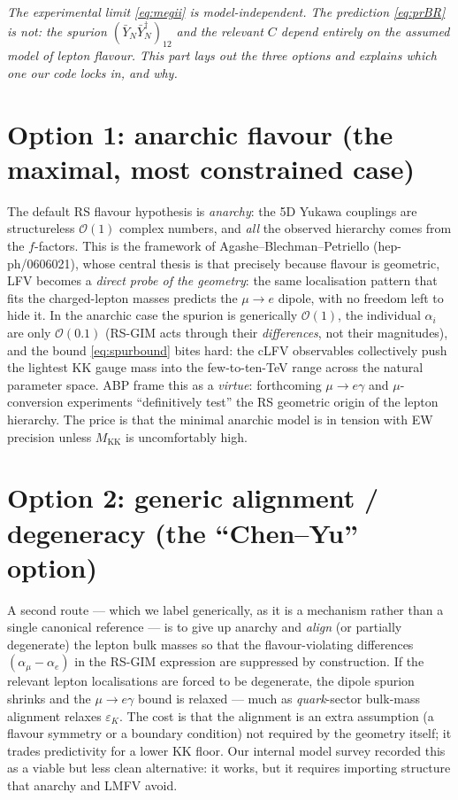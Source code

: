 \documentclass[11pt]{article}
\newcommand{\MKK}{M_{\mathrm{KK}}}
\newcommand{\eps}{\varepsilon}
\newcommand{\YNb}{\bar Y_N}
\newcommand{\spur}{(\YNb\YNb^\dagger)_{12}}
\theoremstyle{definition}
\begin{document}
\emph{The experimental limit \eqref{eq:megii} is model-independent. The
\emph{prediction} \eqref{eq:prBR} is not: the spurion $\spur$ and the relevant
$C$ depend entirely on the assumed model of lepton flavour. This part lays out
the three options and explains which one our code locks in, and why.}

\section{Option 1: anarchic flavour (the maximal, most constrained case)}
\label{sec:anarchic}

The default RS flavour hypothesis is \emph{anarchy}: the 5D Yukawa couplings are
structureless $\mathcal{O}(1)$ complex numbers, and \emph{all} the observed
hierarchy comes from the $f$-factors. This is the framework of
Agashe--Blechman--Petriello (hep-ph/0606021), whose central thesis is that
precisely because flavour is geometric, LFV becomes a \emph{direct probe of the
geometry}: the same localisation pattern that fits the charged-lepton masses
predicts the $\mu\to e$ dipole, with no freedom left to hide it. In the anarchic
case the spurion is generically $\mathcal{O}(1)$, the individual $\alpha_i$ are
only $\mathcal{O}(0.1)$ (RS-GIM acts through their \emph{differences}, not their
magnitudes), and the bound \eqref{eq:spurbound} bites hard: the cLFV observables
collectively push the lightest KK gauge mass into the few-to-ten-TeV range across
the natural parameter space. ABP frame this as a \emph{virtue}: forthcoming
$\mu\to e\gamma$ and $\mu$-conversion experiments ``definitively test'' the RS
geometric origin of the lepton hierarchy. The price is that the minimal anarchic
model is in tension with EW precision unless $\MKK$ is uncomfortably high.

\section{Option 2: generic alignment / degeneracy (the ``Chen--Yu'' option)}
\label{sec:chenyu}

A second route --- which we label generically, as it is a mechanism rather than a
single canonical reference --- is to give up anarchy and \emph{align} (or partially
degenerate) the lepton bulk masses so that the flavour-violating differences
$(\alpha_\mu-\alpha_e)$ in the RS-GIM expression are suppressed by construction.
If the relevant lepton localisations are forced to be degenerate, the dipole
spurion shrinks and the $\mu\to e\gamma$ bound is relaxed --- much as
\emph{quark}-sector bulk-mass alignment relaxes $\eps_K$. The cost is that the
alignment is an extra assumption (a flavour symmetry or a boundary condition) not
required by the geometry itself; it trades predictivity for a lower KK floor. Our
internal model survey recorded this as a viable but less clean alternative: it
works, but it requires importing structure that anarchy and LMFV avoid.
\end{document}

